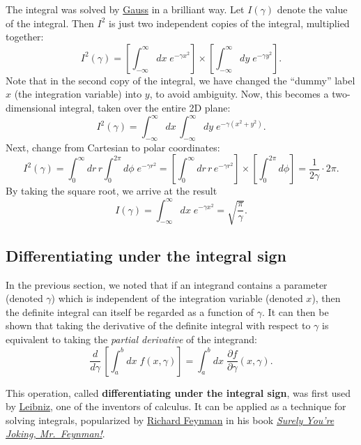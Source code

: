 \documentclass[10pt,a4paper]{article}
\begin{document}
The integral was solved by
\href{http://en.wikipedia.org/wiki/Carl_Friedrich_Gauss}{Gauss} in a
brilliant way. Let $I(\gamma)$ denote the value of the integral. Then
$I^2$ is just two independent copies of the integral, multiplied
together:
\begin{equation}
I^2(\gamma) = \left[\int_{-\infty}^\infty dx\; e^{-\gamma x^2}\right] \times \left[\int_{-\infty}^\infty dy\; e^{-\gamma y^2}\right].
\end{equation}
Note that in the second copy of the integral, we have changed the
``dummy'' label $x$ (the integration variable) into $y$, to avoid
ambiguity. Now, this becomes a two-dimensional integral, taken over the
entire 2D plane:
\begin{equation}
I^2(\gamma) = \int_{-\infty}^\infty dx\, \int_{-\infty}^\infty dy \; e^{-\gamma (x^2+y^2)}.
\end{equation}
Next, change from Cartesian to polar coordinates:
\begin{equation}
I^2(\gamma) = \int_{0}^\infty dr\, r \int_{0}^{2\pi} d\phi \; e^{-\gamma r^2} = \left[ \int_{0}^\infty dr\, r \, e^{-\gamma r^2}\right] \times \left[\int_{0}^{2\pi} d\phi \right] = \frac{1}{2\gamma} \cdot 2\pi.
\end{equation}
By taking the square root, we arrive at the result
\begin{equation}
I(\gamma) = \int_{-\infty}^\infty dx \; e^{-\gamma x^2} = \sqrt{\frac{\pi}{\gamma}}.
\end{equation}

\subsection{Differentiating under the integral sign}
\label{differentiating-under-the-integral-sign}

In the previous section, we noted that if an integrand contains a
parameter (denoted $\gamma$) which is independent of the integration
variable (denoted $x$), then the definite integral can itself be
regarded as a function of $\gamma$. It can then be shown that taking
the derivative of the definite integral with respect to $\gamma$ is
equivalent to taking the \emph{partial derivative} of the integrand:
\begin{equation}
\frac{d}{d\gamma} \, \left[\int_a^b dx\; f(x,\gamma)\right] = \int_a^b dx \; \frac{\partial f}{\partial \gamma}(x,\gamma).
\end{equation}

This operation, called \textbf{differentiating under the integral sign},
was first used by
\href{https://en.wikipedia.org/wiki/Gottfried_Wilhelm_Leibniz}{Leibniz},
one of the inventors of calculus. It can be applied as a technique for
solving integrals, popularized by
\href{https://en.wikipedia.org/wiki/Richard_Feynman}{Richard Feynman}
in his book
\href{https://en.wikipedia.org/wiki/Surely_You\%27re_Joking,_Mr._Feynman!}{\emph{Surely You're Joking, Mr.~Feynman!}}.
\end{document}
